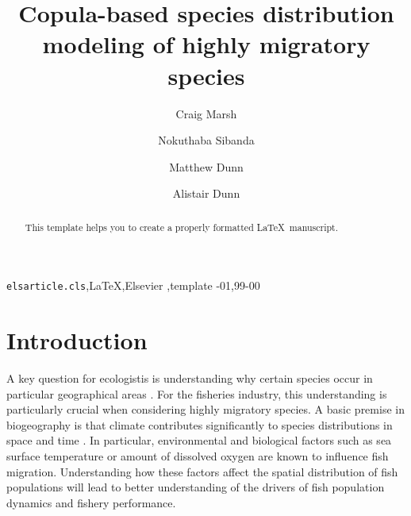 \documentclass[review]{elsarticle}
\begin{document}
\begin{frontmatter}

\title{Copula-based species distribution modeling of highly migratory species}


\author[mymainaddress,mysecondaryaddress]{Craig Marsh}

\author[mysecondaryaddress]{Nokuthaba Sibanda}

\author[mysecondaryaddress]{Matthew Dunn}

\author[mymainaddress]{Alistair Dunn}


\address[mymainaddress]{National Institute of Water and Atmospheric Research, Private Bag 14901, Wellington 6021, New Zealand}
\address[mysecondaryaddress]{Victoria University of Wellington, P O Box 600, Wellington, New Zealand}

\begin{abstract}
This template helps you to create a properly formatted \LaTeX\ manuscript.
\end{abstract}

\begin{keyword}
\texttt{elsarticle.cls}\sep \LaTeX\sep Elsevier \sep template
-01\sep  99-00
\end{keyword}

\end{frontmatter}

\linenumbers

\section{Introduction}
	A key question for ecologistis is understanding why certain species occur in particular geographical areas \citep{nevalainen2013}.  For the fisheries industry, this understanding is particularly crucial when considering highly migratory species.  A basic premise in biogeography is that climate contributes significantly to species distributions in space and time \citep{parmesan1996}. In particular, environmental and biological factors such as sea surface temperature or amount of dissolved oxygen are known to influence fish migration.  Understanding how these factors affect the spatial distribution of fish populations will lead to better understanding of the drivers of fish population dynamics and fishery performance.
		
\end{document}
